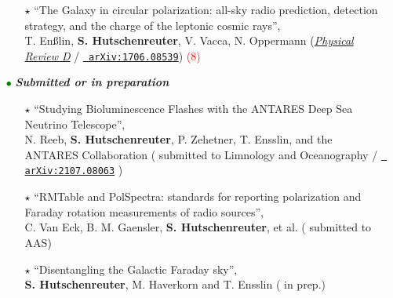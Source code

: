 \begin{itemize}
\begin{itemize}
        \item[\textcolor{Black}{$\star$}]{``The Galaxy in circular polarization: all-sky radio prediction, detection strategy, and the charge of the leptonic cosmic rays'', \\ T. En{\ss}lin,  \textbf{S. Hutschenreuter}, V. Vacca, N. Oppermann   (\href{https://journals.aps.org/prd/abstract/10.1103/PhysRevD.96.043021}{\color{blue}\textit{Physical Review D}} / \href{https://arxiv.org/abs/1706.08539}{\texttt{{\color{blue} arXiv:1706.08539}}})
        \textcolor{red}{(8)}
        }
      \end{itemize}


  \vspace{10pt}
  \item[\textcolor{Green}{$\bullet$}] \textit{\textbf{Submitted or in preparation}}
  \vspace{10pt}

  \begin{itemize}

    \item[\textcolor{Black}{$\star$}]{``Studying Bioluminescence Flashes with the ANTARES Deep Sea Neutrino Telescope'', \\
    N. Reeb, \textbf{S. Hutschenreuter}, P. Zehetner, T. Ensslin, and the ANTARES Collaboration ({\color{blue} submitted to Limnology and Oceanography / \href{https://arxiv.org/abs/2107.08063}{\texttt{{\color{blue} arXiv:2107.08063}}}} })

    \vspace{6pt}

    \item[\textcolor{Black}{$\star$}]{``RMTable and PolSpectra: standards for reporting polarization and Faraday rotation measurements of radio sources'', \\
    C. Van Eck, B. M. Gaensler, \textbf{S. Hutschenreuter}, et al. ({\color{blue}  submitted to AAS}})

    \vspace{6pt}

    \item[\textcolor{Black}{$\star$}]{``Disentangling the Galactic Faraday sky'', \\
     \textbf{S. Hutschenreuter}, M. Haverkorn and  T. Ensslin ({\color{blue}  in prep.}})
  \end{itemize}

\end{itemize}
